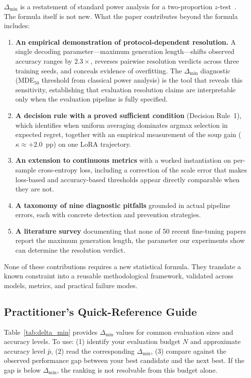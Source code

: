 \documentclass[pdflatex,sn-mathphys-ay,oneside]{sn-jnl}
\theoremstyle{thmstylethree}
\begin{document}
$\Delta_{\min}$ is a restatement of standard power analysis for a two-proportion $z$-test~\citep{cohen1988statistical}. The formula itself is not new. What the paper contributes beyond the formula includes:

\begin{enumerate}
    \item \textbf{An empirical demonstration of protocol-dependent resolution.} A single decoding parameter---maximum generation length---shifts observed accuracy ranges by $2.3\times$, reverses pairwise resolution verdicts across three training seeds, and conceals evidence of overfitting. The $\Delta_{\min}$ diagnostic (MDE$_{50}$ threshold from classical power analysis) is the tool that reveals this sensitivity, establishing that evaluation resolution claims are interpretable only when the evaluation pipeline is fully specified.
    \item \textbf{A decision rule with a proved sufficient condition} (Decision Rule~1), which identifies when uniform averaging dominates argmax selection in expected regret, together with an empirical measurement of the soup gain ($\kappa\approx+2.0$~pp) on one LoRA trajectory.
    \item \textbf{An extension to continuous metrics} with a worked instantiation on per-sample cross-entropy loss, including a correction of the scale error that makes loss-based and accuracy-based thresholds appear directly comparable when they are not.
    \item \textbf{A taxonomy of nine diagnostic pitfalls} grounded in actual pipeline errors, each with concrete detection and prevention strategies.
    \item \textbf{A literature survey} documenting that none of 50 recent fine-tuning papers report the maximum generation length, the parameter our experiments show can determine the resolution verdict.
\end{enumerate}


None of these contributions requires a new statistical formula. They translate a known constraint into a reusable methodological framework, validated across models, metrics, and practical failure modes.

\subsection{Practitioner's Quick-Reference Guide}

Table~\ref{tab:delta_min} provides $\Delta_{\min}$ values for common evaluation sizes and accuracy levels. To use: (1) identify your evaluation budget $N$ and approximate accuracy level $\bar{p}$, (2) read the corresponding $\Delta_{\min}$, (3) compare against the observed performance gap between your best candidate and the next best. If the gap is below $\Delta_{\min}$, the ranking is not resolvable from this budget alone.
\end{document}
